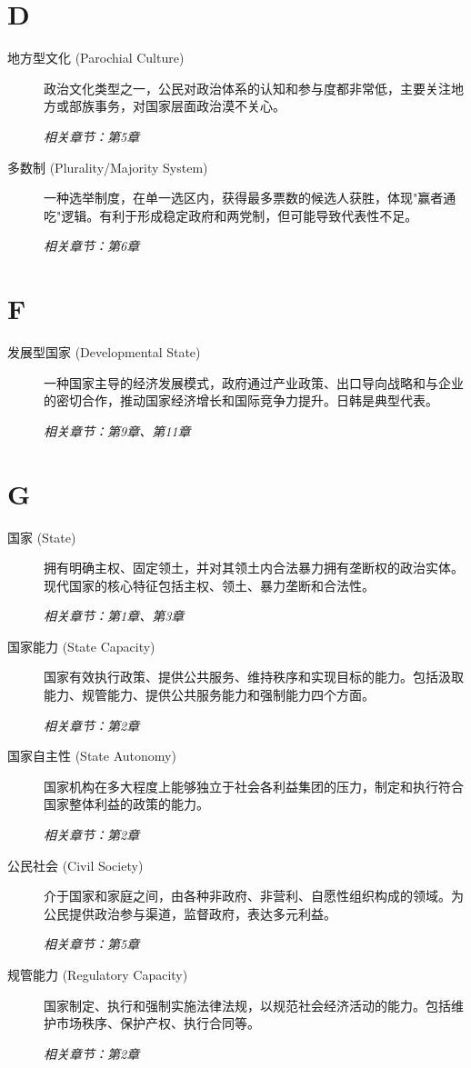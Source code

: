 \section{D}
\begin{description}
    \item[地方型文化 (Parochial Culture)] 政治文化类型之一，公民对政治体系的认知和参与度都非常低，主要关注地方或部族事务，对国家层面政治漠不关心。 \par\textit{相关章节：第5章}
    \item[多数制 (Plurality/Majority System)] 一种选举制度，在单一选区内，获得最多票数的候选人获胜，体现"赢者通吃"逻辑。有利于形成稳定政府和两党制，但可能导致代表性不足。 \par\textit{相关章节：第6章}
\end{description}

\section{F}
\begin{description}
    \item[发展型国家 (Developmental State)] 一种国家主导的经济发展模式，政府通过产业政策、出口导向战略和与企业的密切合作，推动国家经济增长和国际竞争力提升。日韩是典型代表。 \par\textit{相关章节：第9章、第11章}
\end{description}

\section{G}
\begin{description}
    \item[国家 (State)] 拥有明确主权、固定领土，并对其领土内合法暴力拥有垄断权的政治实体。现代国家的核心特征包括主权、领土、暴力垄断和合法性。 \par\textit{相关章节：第1章、第3章}
    \item[国家能力 (State Capacity)] 国家有效执行政策、提供公共服务、维持秩序和实现目标的能力。包括汲取能力、规管能力、提供公共服务能力和强制能力四个方面。 \par\textit{相关章节：第2章}
    \item[国家自主性 (State Autonomy)] 国家机构在多大程度上能够独立于社会各利益集团的压力，制定和执行符合国家整体利益的政策的能力。 \par\textit{相关章节：第2章}
    \item[公民社会 (Civil Society)] 介于国家和家庭之间，由各种非政府、非营利、自愿性组织构成的领域。为公民提供政治参与渠道，监督政府，表达多元利益。 \par\textit{相关章节：第5章}
    \item[规管能力 (Regulatory Capacity)] 国家制定、执行和强制实施法律法规，以规范社会经济活动的能力。包括维护市场秩序、保护产权、执行合同等。 \par\textit{相关章节：第2章}
\end{description}

